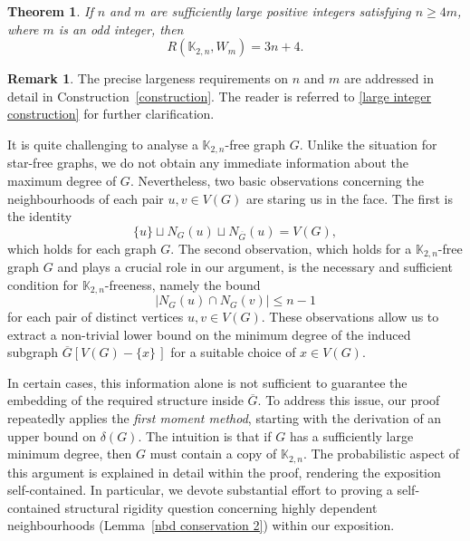 \documentclass[reqno,10pt]{amsart}
\newtheorem{theorem}{Theorem}[section]
\theoremstyle{definition}
\newtheorem*{remark}{Remark}
\begin{document}
\begin{theorem}\label{main theorem}
If $n$ and $m$ are sufficiently large positive integers satisfying $n\geq 4m$, where $m$ is an odd integer, then
\begin{equation*} 
R(\mathbb{K}_{2,n}, W_{m})=3n+4.
\end{equation*}
\end{theorem}
\begin{remark}
The precise largeness requirements on $n$ and $m$ are addressed in detail in Construction~\ref{construction}. The reader is referred to \eqref{large integer construction} for further clarification.
\end{remark}

It is quite challenging to analyse a $\mathbb{K}_{2,n}$-free graph $G$. Unlike the situation for star-free graphs, we do not obtain any immediate information about the maximum degree of $G$. Nevertheless, two basic observations concerning the neighbourhoods of each pair  $u,v\in V(G)$ are staring us in the face. The first is the identity
\begin{equation}\label{nbd complementary dependency}
\{u\}\sqcup N_{G}(u)\sqcup N_{\overline{G}}(u)=V(G),
\end{equation}
which holds for each graph $G$. The second observation, which holds for a $\mathbb{K}_{2,n}$-free graph $G$ and plays a crucial role in our argument, is the necessary and sufficient condition for $\mathbb{K}_{2,n}$-freeness, namely the bound
\begin{equation}\label{K_2n freeness dependency}
|N_{G}(u)\cap N_{G}(v)|\leq n-1
\end{equation}
for each pair of distinct vertices $u,v\in V(G)$. These observations allow us to extract a non-trivial lower bound on the minimum degree of the induced subgraph $\overline{G}[V(G)-\{x\}\,]$ for a suitable choice of $x\in V(G)$.


In certain cases, this information alone is not sufficient to guarantee the embedding of the required structure inside $\overline{G}$. To address this issue, our proof repeatedly applies the \emph{first moment method}, starting with the derivation of an upper bound on $\delta(G)$. The intuition is that if $G$ has a sufficiently large minimum degree, then $G$ must contain a copy of 
$\mathbb{K}_{2,n}$. The probabilistic aspect of this argument is explained in detail within the proof, rendering the exposition self-contained. In particular, we devote substantial effort to proving a self-contained structural rigidity question concerning highly dependent neighbourhoods (Lemma~\ref{nbd conservation 2}) within our exposition.
\end{document}
